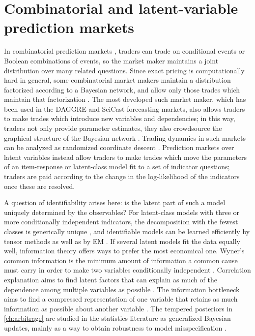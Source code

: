 \section{Combinatorial and latent-variable prediction markets}\label{litrev:sec:latent}
\begin{draftblock}
In combinatorial prediction markets \citep{hansonCombinatorialInformationMarket2003}, traders can trade on conditional events or Boolean combinations of events, so the market maker maintains a joint distribution over many related questions. Since exact pricing is computationally hard in general, some combinatorial market makers maintain a distribution factorized according to a Bayesian network, and allow only those trades which maintain that factorization \citep{pennock2012PriceUpdatingCombinatorialPredictionMarketsBayesianNetworks,sunProbabilityAssetUpdating2012}. The most developed such market maker, which has been used in the DAGGRE and SciCast forecasting markets, also allows traders to make trades which introduce new variables and dependencies; in this way, traders not only provide parameter estimates, they also crowdsource the graphical structure of the Bayesian network \citep{laskeyGraphicalModelMarket2018}. Trading dynamics in such markets can be analyzed as randomized coordinate descent \citep{frongilloConvergenceAnalysisPrediction2015}. Prediction markets over latent variables \citep{tailcalledLatentVariablesPrediction2023} instead allow traders to make trades which move the parameters of an item-response or latent-class model fit to a set of indicator questions; traders are paid according to the change in the log-likelihood of the indicators once these are resolved.

A question of identifiability arises here: is the latent part of such a model uniquely determined by the observables? For latent-class models with three or more conditionally independent indicators, the decomposition with the fewest classes is generically unique \citep{kruskalThreewayArraysRank1977,allmanIdentifiabilityParametersLatent2009}, and identifiable models can be learned efficiently by tensor methods \citep{anandkumarTensorDecompositionsLearning2014} as well as by EM \citep{dempsterMaximumLikelihoodIncomplete1977}. If several latent models fit the data equally well, information theory offers ways to prefer the most economical one. Wyner's common information is the minimum amount of information a common cause must carry in order to make two variables conditionally independent \citep{wynerCommonInformationTwo1975,gastparRelaxedWynersCommon2019}. Correlation explanation aims to find latent factors that can explain as much of the dependence among multiple variables as possible \citep{versteegDiscoveringStructureHighdimensional2014}. The information bottleneck aims to find a compressed representation of one variable that retains as much information as possible about another variable \citep{tishbyInformationBottleneckMethod1999}. The tempered posteriors in \cref{ch:arbitrage} are studied in the statistics literature as generalized Bayesian updates, mainly as a way to obtain robustness to model misspecification \citep{grunwaldSafeBayesianLearning2012,bissiriGeneralFrameworkUpdating2016}.
\end{draftblock}
